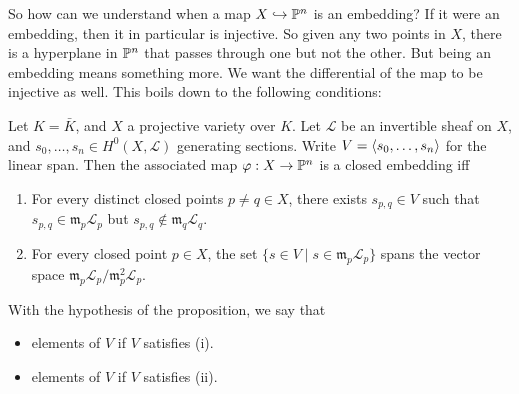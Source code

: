 \documentclass[a4paper]{article}
\begin{document}
So how can we understand when a map $X \hookrightarrow \P^n$ is an embedding? If it were an embedding, then it in particular is injective. So given any two points in $X$, there is a hyperplane in $\P^n$ that passes through one but not the other. But being an embedding means something more. We want the differential of the map to be injective as well. This boils down to the following conditions:

\begin{prop}
  Let $K = \bar{K}$, and $X$ a projective variety over $K$. Let $\mathcal{L}$ be an invertible sheaf on $X$, and $s_0, \ldots, s_n \in H^0(X, \mathcal{L})$ generating sections. Write $V = \bra s_0, \ldots, s_n\ket$ for the linear span. Then the associated map $\varphi: X \to \P^n$ is a closed embedding iff
  \begin{enumerate}
    \item For every distinct closed points $p \not= q \in X$, there exists $s_{p, q} \in V$ such that $s_{p, q} \in \mathfrak{m}_p \mathcal{L}_p$ but $s_{p, q} \not \in \mathfrak{m}_q \mathcal{L}_q$.
    \item For every closed point $p \in X$, the set $\{s \in V \mid s \in \mathfrak{m}_p \mathcal{L}_p\}$ spans the vector space $\mathfrak{m}_p \mathcal{L}_p /\mathfrak{m}^2_p \mathcal{L}_p$.
  \end{enumerate}
\end{prop}

\begin{defi}
  With the hypothesis of the proposition, we say that
  \begin{itemize}
    \item elements of $V$  if $V$ satisfies (i).
    \item elements of $V$  if $V$ satisfies (ii).
  \end{itemize}
\end{defi}
\end{document}
